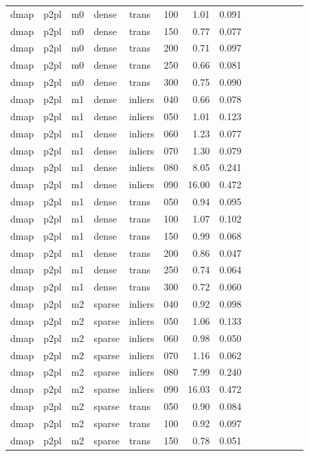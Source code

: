 \begin{table}[htbp]
\begin{tabular}{llllllrrrrrrrr}
  dmap & p2pl & m0 & dense & trans & 100 & 1.01 & 0.091 \\
  dmap & p2pl & m0 & dense & trans & 150 & 0.77 & 0.077 \\
  dmap & p2pl & m0 & dense & trans & 200 & 0.71 & 0.097 \\
  dmap & p2pl & m0 & dense & trans & 250 & 0.66 & 0.081 \\
  dmap & p2pl & m0 & dense & trans & 300 & 0.75 & 0.090 \\
  dmap & p2pl & m1 & dense & inliers & 040 & 0.66 & 0.078 \\
  dmap & p2pl & m1 & dense & inliers & 050 & 1.01 & 0.123 \\
  dmap & p2pl & m1 & dense & inliers & 060 & 1.23 & 0.077 \\
  dmap & p2pl & m1 & dense & inliers & 070 & 1.30 & 0.079 \\
  dmap & p2pl & m1 & dense & inliers & 080 & 8.05 & 0.241 \\
  dmap & p2pl & m1 & dense & inliers & 090 & 16.00 & 0.472 \\
  dmap & p2pl & m1 & dense & trans & 050 & 0.94 & 0.095 \\
  dmap & p2pl & m1 & dense & trans & 100 & 1.07 & 0.102 \\
  dmap & p2pl & m1 & dense & trans & 150 & 0.99 & 0.068 \\
  dmap & p2pl & m1 & dense & trans & 200 & 0.86 & 0.047 \\
  dmap & p2pl & m1 & dense & trans & 250 & 0.74 & 0.064 \\
  dmap & p2pl & m1 & dense & trans & 300 & 0.72 & 0.060 \\
  dmap & p2pl & m2 & sparse & inliers & 040 & 0.92 & 0.098 \\
  dmap & p2pl & m2 & sparse & inliers & 050 & 1.06 & 0.133 \\
  dmap & p2pl & m2 & sparse & inliers & 060 & 0.98 & 0.050 \\
  dmap & p2pl & m2 & sparse & inliers & 070 & 1.16 & 0.062 \\
  dmap & p2pl & m2 & sparse & inliers & 080 & 7.99 & 0.240 \\
  dmap & p2pl & m2 & sparse & inliers & 090 & 16.03 & 0.472 \\
  dmap & p2pl & m2 & sparse & trans & 050 & 0.90 & 0.084 \\
  dmap & p2pl & m2 & sparse & trans & 100 & 0.92 & 0.097 \\
  dmap & p2pl & m2 & sparse & trans & 150 & 0.78 & 0.051 \\

\end{tabular}
\end{table}
